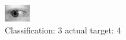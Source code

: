 \begin{figure}[h!]
\begin{center}
\includegraphics[width=0.60\columnwidth]{figures/ID755_class_3_target_4.png}
\end{center}
\caption{ Classification: 3 actual target: 4}
\label{fig:ID755_class_3_target_4}
\end{figure}
